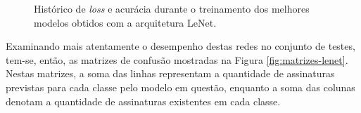 \begin{figure}[h!]
	\centering
	\caption{Histórico de \emph{loss} e acurácia durante o treinamento dos melhores modelos obtidos com a arquitetura LeNet.}
	\hfill
	\hfill
	\hfill
	\label{fig:treinamento-lenet}
\end{figure}

Examinando mais atentamente o desempenho destas redes no conjunto de testes, tem-se, então, as matrizes de confusão mostradas na Figura \ref{fig:matrizes-lenet}. Nestas matrizes, a soma das linhas representam a quantidade de assinaturas previstas para cada classe pelo modelo em questão, enquanto a soma das colunas denotam a quantidade de assinaturas existentes em cada classe.

